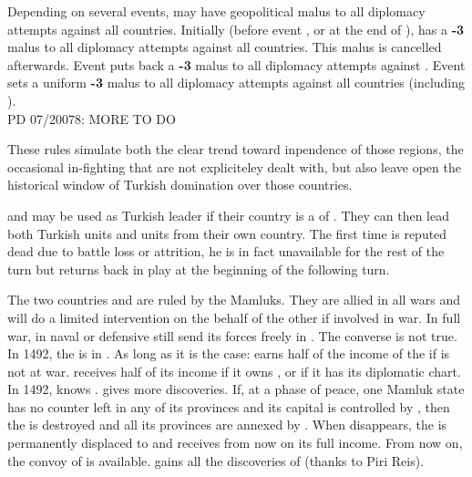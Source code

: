 Depending on several events, \TUR may have geopolitical malus to all diplomacy
attempts against all  countries.
\bparag Initially (before event , or  at the end of
), \TUR has a {\bf -3} malus to all diplomacy attempts
against all  countries.  This malus is cancelled
afterwards.
\bparag Event  puts back a {\bf -3} malus to all
diplomacy attempts against .
\bparag Event  sets a uniform {\bf -3} malus
to all diplomacy attempts against all  countries
(including ).
\\
PD 07/20078: MORE TO DO
\begin{designnote}
These rules simulate both the clear trend toward inpendence of those regions,
the occasional in-fighting that are not expliciteley dealt with, but also leave
open the historical window of Turkish domination over those countries.
\end{designnote}

 and  may be used as Turkish leader if
their country is a \VASSAL of \TUR. They can then lead both Turkish
units and units from their own country.
 The first time  is
reputed dead due to battle loss or attrition, he is in fact unavailable
for the rest of the turn but returns back in play at the beginning of
the following turn.

\label{chSpecific:Mamluks}
\aparag The two countries  and  are ruled by
the Mamluks. They are allied in all wars and will do a limited intervention
on the behalf of the other if involved in war.
\bparag In full war,  in naval or defensive
still send its forces freely in . The converse is not true.
 In 1492, the  is in
. As long as it is the case:
\bparag \VEN earns half of the income of the  if
 is not at war.
\bparag \TUR receives half of its income if it owns , or if
it has  its diplomatic chart.
\bparag In 1492,  knows
.  gives more
discoveries.
 If, at a phase of peace, one Mamluk state
has no \ARMY counter left in any of its provinces and its capital is
controlled by \TUR, then the \MIN is destroyed and all its provinces are
annexed by \TUR.
\bparag When  disappears, the  is
permanently displaced to  and \TUR receives from now on
its full income. From now on, the convoy of  is available.
\TUR gains all the discoveries of  (thanks to Piri Reis).

